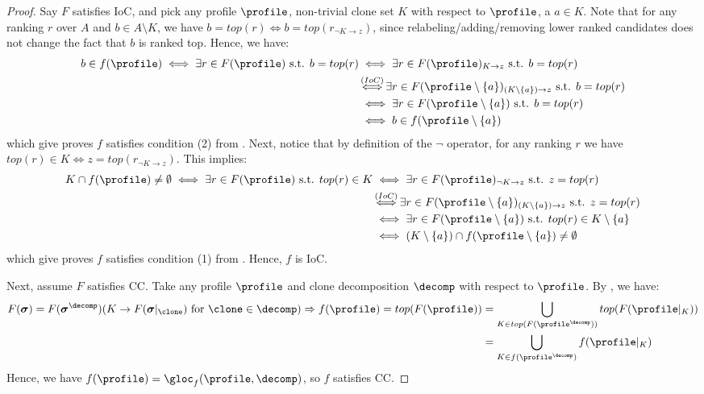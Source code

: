 \begin{proof}
    Say $F$ satisfies IoC, and pick any profile $\profile$, non-trivial clone set $K$ with respect to $\profile$, a $a\in K$. Note that for any ranking $r$ over $A$ and $b \in A \setminus K$, we have $b=top(r) \iff b=top(r_{\neg K \rightarrow z})$, since relabeling/adding/removing lower ranked candidates does not change the fact that $b$ is ranked top. Hence, we have:
 \begin{align*}
     b\in f(\profile) \iff   \exists r \in F(\profile)\text{ s.t. } b=top(r) &\iff  \exists r \in F(\profile)_{K \rightarrow z}\text{ s.t. } b=top(r) \\&\overset{(IoC)}{{\iff}}   \exists r \in F(\profile \setminus \{a\})_{(K \setminus \{a\})\rightarrow z}\text{ s.t. } b=top(r)\\
     &\iff \exists r \in F(\profile \setminus \{a\})\text{ s.t. } b=top(r)\\& \iff b \in f(\profile\setminus\{a\})
 \end{align*}
 which give proves $f$ satisfies condition (2) from . Next, notice that by definition of the $\neg$ operator, for any ranking $r$ we have $top(r) \in K \iff z=top(r_{\neg K \rightarrow z})$. This implies:
 \begin{align}
     K \cap f(\profile) \neq \emptyset  \iff \exists r \in F(\profile)\text{ s.t. } top(r) \in K &\iff \exists r \in F(\profile)_{\neg K \rightarrow z}\text{ s.t. } z=top(r)
     \\&\overset{(IoC)}{{\iff}}   \exists r \in F(\profile \setminus \{a\})_{(K \setminus \{a\})\rightarrow z}\text{ s.t. } z=top(r)\\
     &\iff \exists r \in F(\profile \setminus \{a\})\text{ s.t. } top(r) \in K\setminus\{a\} \\& \iff  (K\setminus\{a\}) \cap  f(\profile\setminus\{a\}) \neq \emptyset
 \end{align}
 which give proves $f$ satisfies condition (1) from . Hence, $f$ is IoC.

 Next, assume $F$ satisfies CC. Take any profile $\profile$ and clone decomposition $\decomp$ with respect to $\profile$. By , we have:
 \begin{align*}
     F(\boldsymbol{\sigma}) = F(\boldsymbol{\sigma}^\decomp)(K \rightarrow F(\boldsymbol{\sigma}|_\clone)\text{ for }\clone \in \decomp) \Rightarrow f(\profile) = top(F(\profile)) &= \bigcup_{K \in top(F(\profile^\decomp))}top(F(\profile|_{K}))\\&=\bigcup_{K \in f(\profile^\decomp)}f(\profile|_{K})
 \end{align*}
Hence, we have $f(\profile)=\gloc_f(\profile,\decomp)$, so $f$ satisfies CC.
\end{proof}

